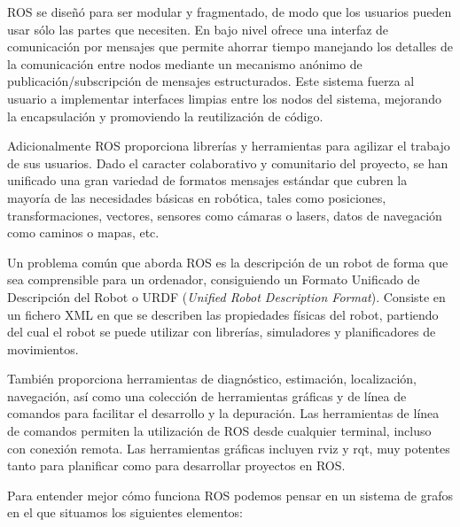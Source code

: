 ROS se diseñó para ser modular y fragmentado, de modo que los usuarios pueden usar sólo las partes que necesiten. En bajo nivel ofrece una interfaz de comunicación por mensajes que permite ahorrar tiempo manejando los detalles de la comunicación entre nodos mediante un mecanismo anónimo de publicación/subscripción de mensajes estructurados. Este sistema fuerza al usuario a implementar interfaces limpias entre los nodos del sistema, mejorando la encapsulación y promoviendo la reutilización de código.

Adicionalmente ROS proporciona librerías y herramientas para agilizar el trabajo de sus usuarios. Dado el caracter colaborativo y comunitario del proyecto, se han unificado una gran variedad de formatos mensajes estándar que cubren la mayoría de las necesidades básicas en robótica, tales como posiciones, transformaciones, vectores, sensores como cámaras o lasers, datos de navegación como caminos o mapas, etc. 

Un problema común que aborda ROS es la descripción de un robot de forma que sea comprensible para un ordenador, consiguiendo un Formato Unificado de Descripción del Robot o URDF (\textit{Unified Robot Description Format}). Consiste en un fichero XML en que se describen las propiedades físicas del robot, partiendo del cual el robot se puede utilizar con librerías, simuladores y planificadores de movimientos.

También proporciona herramientas de diagnóstico, estimación, localización, navegación, así como una colección de herramientas gráficas y de línea de comandos para facilitar el desarrollo y la depuración. Las herramientas de línea de comandos permiten la utilización de ROS desde cualquier terminal, incluso con conexión remota. Las herramientas gráficas incluyen rviz y rqt, muy potentes tanto para planificar como para desarrollar proyectos en ROS.

Para entender mejor cómo funciona ROS podemos pensar en un sistema de grafos en el que situamos los siguientes elementos:

